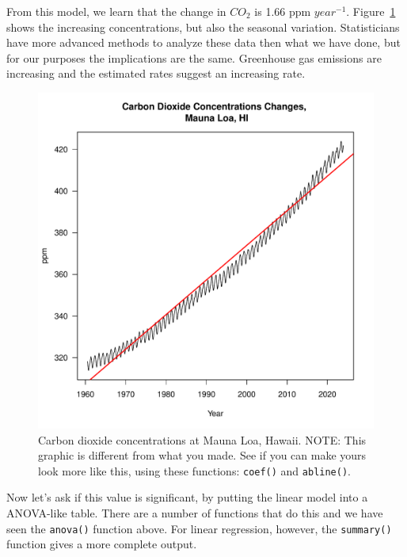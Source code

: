 \documentclass{tufte-handout}\usepackage[]{graphicx}\usepackage[]{xcolor}
\makeatletter
\def\maxwidth{ %
  \ifdim\Gin@nat@width>\linewidth
    \linewidth
  \else
    \Gin@nat@width
  \fi
}
\newenvironment{knitrout}{}{} %
\makeatother
\begin{document}
From this model, we learn that the change in $CO_2$ is 1.66 ppm $year^{-1}$. Figure~\ref{fig:maunaloa} shows the increasing concentrations, but also the seasonal variation. Statisticians have more advanced methods to analyze these data then what we have done, but for our purposes the implications are the same.  Greenhouse gas emissions are increasing and the estimated rates suggest an increasing rate.

\begin{figure}
\label{fig:maunaloa}
\caption{Carbon dioxide concentrations at Mauna Loa, Hawaii. NOTE: This graphic is different from what you made. See if you can make yours look more like this, using these functions: \texttt{coef()} and \texttt{abline()}.}
\begin{knitrout}
\color{fgcolor}
\includegraphics[width=\maxwidth]{figure/unnamed-chunk-54-1} 
\end{knitrout}
\end{figure}

Now let's ask if this value is significant, by putting the linear model into a ANOVA-like table. There are a number of functions that do this and we have seen the \texttt{anova()} function above. For linear regression, however, the \texttt{summary()} function gives a more complete output.
\end{document}
